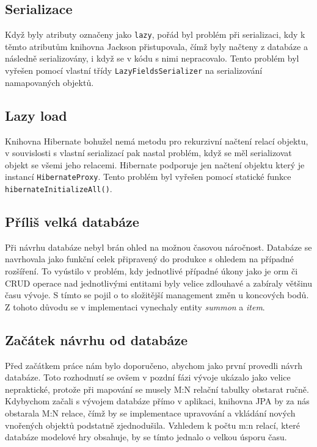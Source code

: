 \subsection{Serializace}
Když byly atributy označeny jako \texttt{lazy}, pořád byl problém při serializaci, kdy k těmto atributům knihovna Jackson přistupovala, čímž byly načteny z databáze a následně serializovány, i když se v kódu s nimi nepracovalo. Tento problém byl vyřešen pomocí vlastní třídy \texttt{LazyFieldsSerializer}
na serializování namapovaných objektů. 

\subsection{Lazy load}
Knihovna Hibernate bohužel nemá metodu pro rekurzivní načtení relací objektu, v souvislosti s vlastní serializací pak nastal problém, když se měl serializovat objekt se všemi jeho relacemi. Hibernate podporuje jen načtení objektu který je instancí \texttt{HibernateProxy}. Tento problém byl vyřešen pomocí statické funkce \texttt{hibernateInitializeAll()}. 

\subsection{Příliš velká databáze}
Při návrhu databáze nebyl brán ohled na možnou časovou náročnost. Databáze se navrhovala jako funkční celek připravený do produkce s ohledem na případné rozšíření. To vyústilo v problém, kdy jednotlivé případné úkony jako je \gls{orm} či CRUD operace nad jednotlivými entitami byly velice zdlouhavé a zabíraly většinu času vývoje. S tímto se pojil o to složitější management změn u koncových bodů. Z tohoto důvodu se v implementaci vynechaly entity \textit{summon} a \textit{item}.

\subsection{Začátek návrhu od databáze}
Před začátkem práce nám bylo doporučeno, abychom jako první provedli návrh databáze. Toto rozhodnutí se ovšem v pozdní fázi vývoje ukázalo jako velice nepraktické, protože při mapování se musely M:N relační tabulky obstarat ručně. Kdybychom začali s vývojem databáze přímo v aplikaci, knihovna JPA  by za nás obstarala M:N relace, čímž by se implementace upravování a vkládání nových vnořených objektů podstatně zjednodušila. Vzhledem k počtu m:n relací, které databáze modelové hry obsahuje, by se tímto jednalo o velkou úsporu času.